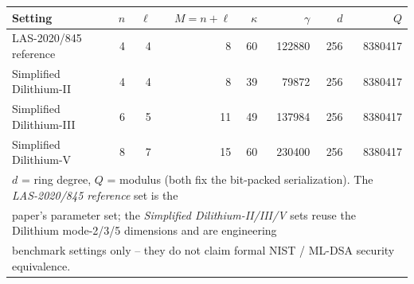 \begin{tabular}{l r r r r r r r}
\hline
Setting & $n$ & $\ell$ & $M=n+\ell$ & $\kappa$ & $\gamma$ & $d$ & $Q$ \\
\hline
LAS-2020/845 reference & 4 & 4 & 8 & 60 & 122880 & 256 & 8380417 \\
Simplified Dilithium-II & 4 & 4 & 8 & 39 & 79872 & 256 & 8380417 \\
Simplified Dilithium-III & 6 & 5 & 11 & 49 & 137984 & 256 & 8380417 \\
Simplified Dilithium-V & 8 & 7 & 15 & 60 & 230400 & 256 & 8380417 \\
\hline
\multicolumn{8}{l}{\footnotesize $d$ = ring degree, $Q$ = modulus (both fix the bit-packed serialization). The \emph{LAS-2020/845 reference} set is the} \\
\multicolumn{8}{l}{\footnotesize paper's parameter set; the \emph{Simplified Dilithium-II/III/V} sets reuse the Dilithium mode-2/3/5 dimensions and are engineering} \\
\multicolumn{8}{l}{\footnotesize benchmark settings only -- they do not claim formal NIST / ML-DSA security equivalence.} \\
\hline
\end{tabular}
